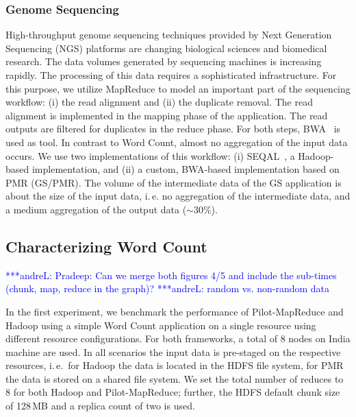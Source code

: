 \documentclass{acm_proc_article-sp}
\newcommand{\alnote}[1]{ {\textcolor{blue} { ***andreL: #1 }}}
\newcommand{\pnote}[1]{ {\textcolor{magenta} { ***pradeep: #1 }}}
\newcommand{\alnote}[1]{}
\newcommand{\pnote}[1]{}
\newcommand{\pilotmapreduce}{Pilot-MapReduce\xspace}
\begin{document}


\subsubsection*{Genome Sequencing}

High-throughput genome sequencing techniques provided by Next Generation
Sequencing (NGS) platforms are changing biological sciences and biomedical
research. The data volumes generated by sequencing machines is 
increasing rapidly. The processing of this data requires a sophisticated 
infrastructure. For this purpose, we utilize MapReduce to model an important 
part of the sequencing workflow: (i) the read alignment and (ii) the 
duplicate removal. The read alignment is implemented in the mapping phase of 
the application. The read outputs are filtered for duplicates in the reduce 
phase. For both steps, BWA~\cite{Li:2010:FAL:1741823.1741825} is used as tool. 
In contrast to Word Count, almost no aggregation of the input data occurs.
We use two implementations of this workflow: (i) SEQAL~\cite{seal-2011}, a 
Hadoop-based implementation, and (ii) a custom, BWA-based implementation based 
on PMR (GS/PMR). The volume of the intermediate data of the GS application is 
about the size of the input data, i.\,e. no aggregation of the intermediate 
data, and a medium aggregation of the output data ($\sim$30$\%$).


\subsection{Characterizing Word Count}
\alnote{Pradeep: Can we merge both figures 4/5 and include the sub-times (chunk, map, reduce in the graph)?}
\alnote{random vs. non-random data}

In the first experiment, we benchmark the performance of \pilotmapreduce and
Hadoop using a simple Word Count application on a single resource using
different resource configurations. For both frameworks, a total of 8 nodes on
India machine are used. In all scenarios the input data is pre-staged on the
respective resources, i.\,e.\ for Hadoop the data is located in the HDFS file
system, for PMR the data is stored on a shared file system. We set the total
number of reduces to 8 for both Hadoop and \pilotmapreduce; further, the HDFS 
default chunk size of 128\,MB and a replica count of two is used.
\end{document}
